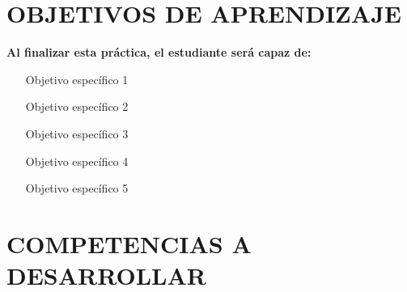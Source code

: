 \documentclass[12pt,a4paper]{article}
\begin{document}
	\section{OBJETIVOS DE APRENDIZAJE}
	
	\begin{objetivobox}
		\textbf{Al finalizar esta práctica, el estudiante será capaz de:}
		\begin{enumerate}
			\item [Objetivo específico 1]
			\item [Objetivo específico 2]
			\item [Objetivo específico 3]
			\item [Objetivo específico 4]
			\item [Objetivo específico 5]
		\end{enumerate}
	\end{objetivobox}
	
	
	\section{COMPETENCIAS A DESARROLLAR}
	
\end{document}
